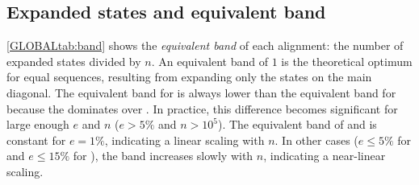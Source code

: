 \subsection{Expanded states and equivalent band} \label{GLOBALsec:expanded}



\cref{GLOBALtab:band} shows the \emph{equivalent band} of each alignment: the number
of expanded states divided by $n$. An equivalent band of $1$ is the theoretical
optimum for equal sequences, resulting from expanding only the states on the
main diagonal. The equivalent band for \CSH is always lower than the equivalent
band for \SH because the \csh dominates over \sh. In practice, this difference
becomes significant for large enough $e$ and $n$ ($e{>}5\%$ and $n{>}10^5$). The
equivalent band of \SH and \CSH is constant for $e{=}1\%$, indicating a linear
scaling with $n$. In other cases ($e{\leq}5\%$ for \SH and $e{\leq}15\%$ for
\CSH), the band increases slowly with $n$, indicating a near-linear scaling.
